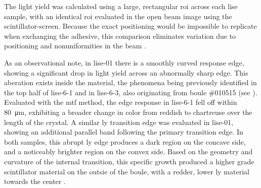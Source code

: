 \documentclass[../../../main.tex]{subfiles}%
\begin{document}
    The light yield was calculated using a large, rectangular \gls{roi} across each \gls{lise} sample, with an identical \gls{roi} evaluated in the open beam image using the \gls{scintillator-screen}.
    Because the exact positioning would be impossible to replicate when exchanging the adhesive, this comparison eliminates variation due to positioning and nonuniformities in the beam \cite{Lukosi_2017}.
    \par%
    As an observational note, in \gls{lise-01} there is a smoothly curved response edge, showing a significant drop in light yield across an abnormally sharp edge.
    This aberation exists inside the material, the phenomena being previously identified in the top half of \gls{lise-6-1} and in \gls{lise-6-3}, also originating from boule {{\#}010515} (see ).
    Evaluated with the \gls{mtf} method, the edge response in \gls{lise-6-1} fell off within \SI{80}{\micro\meter}, exhibiting a broader change in color from reddish to chartreuse over the length of the crystal.
    A similar \gls{ly} transition edge was evaluated in \gls{lise-01}, showing an additional parallel band following the primary transition edge.
    In both samples, this abrupt \gls{ly} edge produces a dark region on the concave side, and a noticeably brighter region on the convex side.
    Based on the geometry and curvature of the internal transition, this specific growth produced a higher grade scintillator material on the outsie of the boule, with a redder, lower \gls{ly} material towards the center \cite{Lukosi_2016a}.
\end{document}
